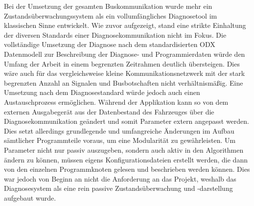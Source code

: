 Bei der Umsetzung der gesamten Buskommunikation wurde mehr ein Zustandsüberwachungssystem als ein vollumfängliches Diagnosetool im klassischen Sinne entwickelt. Wie zuvor aufgezeigt, stand eine strikte Einhaltung der diversen Standards einer Diagnosekommunikation nicht im Fokus. Die vollständige Umsetzung der Diagnose nach dem standardisierten \acs{ODX} Datenmodell zur Beschreibung der Diagnose- und Programmierdaten würde den Umfang der Arbeit in einem begrenzten Zeitrahmen deutlich übersteigen. Dies wäre auch für das vergleichsweise kleine Kommunikationsnetzwerk mit der stark begrenzten Anzahl an Signalen und Busbotschaften nicht verhältnismäßig. Eine Umsetzung nach dem Diagnosestandard würde jedoch auch einen Austauschprozess ermöglichen. Während der Applikation kann so von dem externen Ausgabegerät aus der Datenbestand des Fahrzeuges über die Diagnosekommunikation geändert und somit Parameter extern angepasst werden. Dies setzt allerdings grundlegende und umfangreiche Änderungen im Aufbau sämtlicher Programmteile voraus, um eine Modularität zu gewährleisten. Um Parameter nicht nur passiv auszugeben, sondern auch aktiv in den Algorithmen ändern zu können, müssen eigens Konfigurationsdateien erstellt werden, die dann von den einzelnen Programmknoten gelesen und beschrieben werden können. Dies war jedoch von Beginn an nicht die Anforderung an das Projekt, weshalb das Diagnosesystem als eine rein passive Zustandsüberwachung und -darstellung aufgebaut wurde. 

